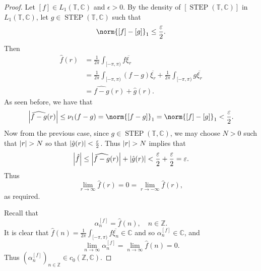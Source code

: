 \documentclass[notoc,notitlepage]{tufte-book}
\DeclareMathOperator{\STEP}{STEP}
\begin{document}
\begin{proof}
  \noindent
  Let $[f] \in L_1(\mathbb{T}, \mathbb{C})$ and $\epsilon > 0$.
  By the density of $[\STEP(\mathbb{T}, \mathbb{C})]$
  in $L_1(\mathbb{T}, \mathbb{C})$,
  let $g \in \STEP(\mathbb{T}, \mathbb{C})$ such that
  \begin{equation*}
    \norm{[f] - [g]}_1 \leq \frac{\epsilon}{2}.
  \end{equation*}
  Then
  \begin{align*}
    \hat{f}(r)
    &= \frac{1}{2 \pi} \int_{[-\pi, \pi)} f \overline{\xi_r} \\
    &= \frac{1}{2 \pi} \int_{[-\pi, \pi)} (f - g) \overline{\xi_r}
      + \frac{1}{2 \pi} \int_{[-\pi, \pi)} g \overline{\xi_r} \\
    &= \widehat{f - g}(r) + \hat{g}(r).
  \end{align*}
  As seen before,
  we have that
  \begin{equation*}
    \abs{\widehat{f - g}(r)} \leq \nu_1(f - g)
    = \norm{[f - g]}_1 = \norm{[f] - [g]}_1 < \frac{\epsilon}{2}.
  \end{equation*}
  Now from the previous case, since $g \in \STEP(\mathbb{T}, \mathbb{C})$,
  we may choose $N > 0$ such that $\left|r\right| > N$ so that
  $\left|\hat{g}(r)\right| < \frac{\varepsilon}{2}$.
  Thus $\left|r\right| > N$ implies that
  \begin{equation*}
    \left|\hat{f}\right| \leq \left| \widehat{f - g}(r) \right| + \left| \hat{g}(r) \right|
    < \frac{\varepsilon}{2} + \frac{\varepsilon}{2} = \varepsilon.
  \end{equation*}
  Thus
  \begin{equation*}
    \lim_{r \to \infty} \hat{f}(r) = 0 = \lim_{r \to -\infty} \hat{f}(r),
  \end{equation*}
  as required.

  Recall that
  \begin{equation*}
    \alpha_n^{[f]} = \hat{f}(n), \quad n \in \mathbb{Z}.
  \end{equation*}
  It is clear that $\hat{f}(n) = \frac{1}{2 \pi} \int_{[-\pi, \pi)} f
  \overline{\xi_n} \in \mathbb{C}$ and so $\alpha_n^{[f]} \in \mathbb{C}$,
  and
  \begin{equation*}
    \lim_{n \to \infty} \alpha_n^{[f]} = \lim_{n \to \infty} \hat{f}(n) = 0.
  \end{equation*}
  Thus $\left(\alpha_n^{[f]}\right)_{n \in \mathbb{Z}} \in c_0(\mathbb{Z}, \mathbb{C})$.
\end{proof}
\end{document}
